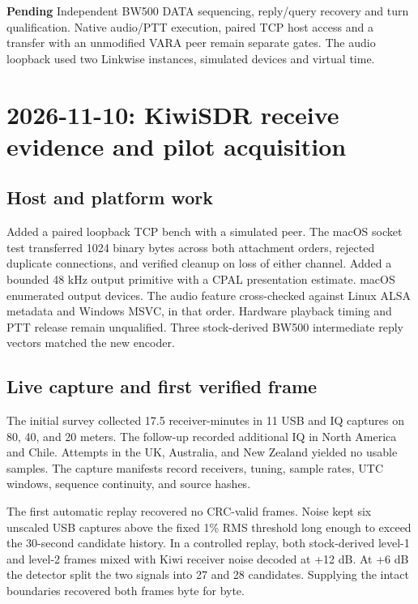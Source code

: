 \documentclass[11pt,a4paper]{article}
\newcommand{\statuspending}{\textcolor{pending}{\textbf{Pending}}}
\begin{document}
\statuspending{} Independent BW500 DATA sequencing, reply/query recovery and
turn qualification. Native audio/PTT execution, paired TCP host access and a
transfer with an unmodified VARA peer remain separate gates. The audio loopback
used two Linkwise instances, simulated devices and virtual time.

\section{2026-11-10: KiwiSDR receive evidence and pilot acquisition}
\label{sec:kiwi-pilot-2026-11-10}

\subsection{Host and platform work}

Added a paired loopback TCP bench with a simulated peer. The macOS socket
test transferred 1024 binary bytes across both attachment orders, rejected
duplicate connections, and verified cleanup on loss of either channel.
Added a bounded 48 kHz output primitive with a CPAL presentation estimate.
macOS enumerated output devices. The audio feature cross-checked against
Linux ALSA metadata and Windows MSVC, in that order. Hardware playback
timing and PTT release remain unqualified. Three stock-derived BW500
intermediate reply vectors matched the new encoder.

\subsection{Live capture and first verified frame}

The initial survey collected 17.5 receiver-minutes in 11 USB and IQ
captures on 80, 40, and 20 meters. The follow-up recorded additional IQ in
North America and Chile. Attempts in the UK, Australia, and New Zealand
yielded no usable samples. The capture manifests record receivers, tuning,
sample rates, UTC windows, sequence continuity, and source hashes.

The first automatic replay recovered no CRC-valid frames. Noise kept six
unscaled USB captures above the fixed 1\% RMS threshold long enough to
exceed the 30-second candidate history. In a controlled replay, both
stock-derived level-1 and level-2 frames mixed with Kiwi receiver noise
decoded at +12 dB. At +6 dB the detector split the two signals into 27
and 28 candidates. Supplying the intact boundaries recovered both
frames byte for byte.
\end{document}
